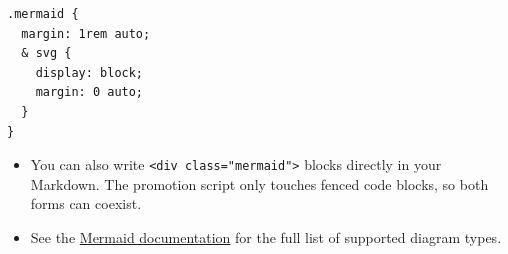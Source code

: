\documentclass{article}
\begin{document}
\begin{lstlisting}
.mermaid {
  margin: 1rem auto;
  & svg {
    display: block;
    margin: 0 auto;
  }
}

\end{lstlisting}
\begin{itemize}
\item You can also write \texttt{<div class="mermaid">} blocks directly in your Markdown. The promotion script only touches fenced code blocks, so both forms can coexist.

\item See the \href{https://mermaid.js.org/intro/}{Mermaid documentation} for the full list of supported diagram types.

\end{itemize}
\end{document}
